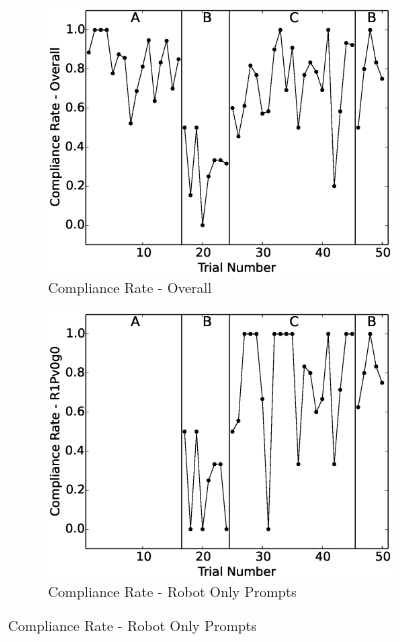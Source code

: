 \documentclass{ut-thesis}
\begin{document}
\begin{figure}[h]
	\centering
	\begin{subfigure}[b]{0.49\textwidth}
		\includegraphics[width=1.1\linewidth]{./img/data_analysis/102ComplianceRate-Overall.eps}
		\caption{Compliance Rate - Overall}
		\label{fig:102ComplianceRate-Overall}
	\end{subfigure}
	\hfill
	\begin{subfigure}[b]{0.49\textwidth}
		\includegraphics[width=1.1\linewidth]{./img/data_analysis/79ComplianceRate-R1Pv0g0.eps}
		\caption{Compliance Rate - Robot Only Prompts}
		\label{fig:79ComplianceRate-R1Pv0g0}
	\end{subfigure}%


\end{figure}
\end{document}

